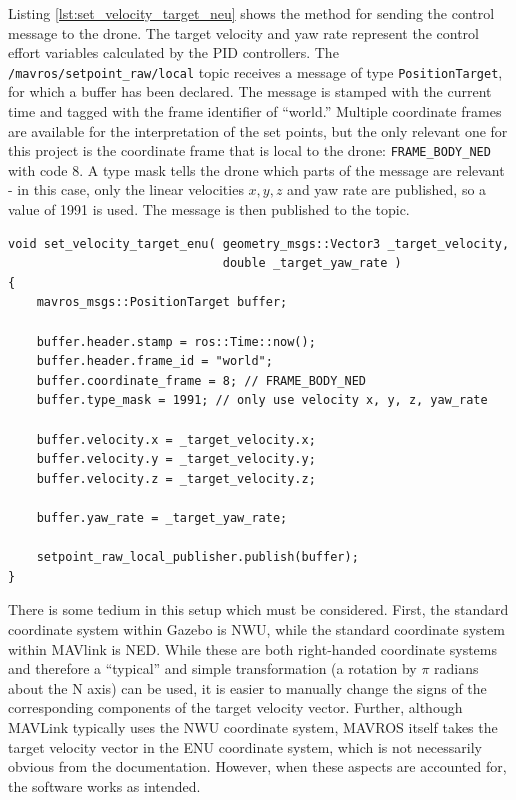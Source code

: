 Listing \ref{lst:set_velocity_target_neu} shows the method for sending the control message to the drone. The target velocity and yaw rate represent the control effort variables calculated by the PID controllers. The \texttt{/mavros/setpoint\_raw/local} topic receives a message of type \texttt{PositionTarget}, for which a buffer has been declared. The message is stamped with the current time and tagged with the frame identifier of ``world.'' Multiple coordinate frames are available for the interpretation of the set points, but the only relevant one for this project is the coordinate frame that is local to the drone: \texttt{FRAME\_BODY\_NED} with code 8. A type mask tells the drone which parts of the message are relevant - in this case, only the linear velocities $x,y,z$ and yaw rate are published, so a value of 1991 is used. The message is then published to the topic.
\begin{lstlisting}[style=C++,caption={The simple function that allows the landing controller to control the drone's target velocities.},captionpos=b,label={lst:set_velocity_target_neu}]
void set_velocity_target_enu( geometry_msgs::Vector3 _target_velocity,
                              double _target_yaw_rate )
{
	mavros_msgs::PositionTarget buffer;

	buffer.header.stamp = ros::Time::now();
	buffer.header.frame_id = "world";
	buffer.coordinate_frame = 8; // FRAME_BODY_NED
	buffer.type_mask = 1991; // only use velocity x, y, z, yaw_rate

	buffer.velocity.x = _target_velocity.x;
	buffer.velocity.y = _target_velocity.y;
	buffer.velocity.z = _target_velocity.z;

	buffer.yaw_rate = _target_yaw_rate;

	setpoint_raw_local_publisher.publish(buffer);
}
\end{lstlisting}

There is some tedium in this setup which must be considered. First, the standard coordinate system within Gazebo is \gls{NWU}, while the standard coordinate system within MAVlink is \gls{NED}. While these are both right-handed coordinate systems and therefore a ``typical'' and simple transformation (a rotation by $\pi$ radians about the N axis) can be used, it is easier to manually change the signs of the corresponding components of the target velocity vector. Further, although MAVLink typically uses the \gls{NWU} coordinate system, MAVROS itself takes the target velocity vector in the \gls{ENU} coordinate system, which is not necessarily obvious from the documentation. However, when these aspects are accounted for, the software works as intended.

